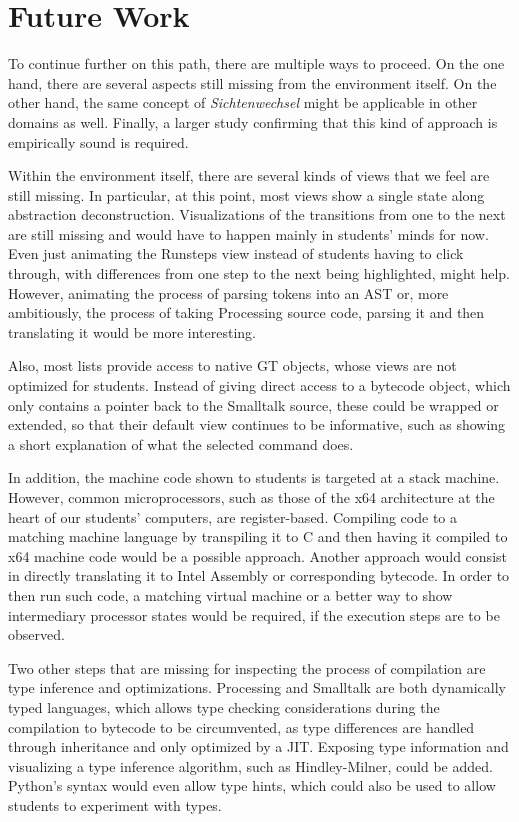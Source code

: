 \section{Future Work} \label{sc_future}

To continue further on this path, there are multiple ways to proceed. On the one hand, there are several aspects still missing from the environment itself. On the other hand, the same concept of \emph{Sichtenwechsel} might be applicable in other domains as well. Finally, a larger study confirming that this kind of approach is empirically sound is required.

Within the environment itself, there are several kinds of views that we feel are still missing. In particular, at this point, most views show a single state along abstraction deconstruction. Visualizations of the transitions from one to the next are still missing and would have to happen mainly in students' minds for now. Even just animating the Runsteps view instead of students having to click through, with differences from one step to the next being highlighted, might help. However, animating the process of parsing tokens into an \ac{AST} or, more ambitiously, the process of taking Processing source code, parsing it and then translating it would be more interesting.

Also, most lists provide access to native \ac{GT} objects, whose views are not optimized for students. Instead of \eg giving direct access to a bytecode object, which only contains a pointer back to the Smalltalk source, these could be wrapped or extended, so that their default view continues to be informative, such as showing a short explanation of what the selected command does.

In addition, the machine code shown to students is targeted at a stack machine. However, common microprocessors, such as those of the x64 architecture at the heart of our students' computers, are register-based. Compiling code to a matching machine language by \eg transpiling it to C and then having it compiled to x64 machine code would be a possible approach. Another approach would consist in directly translating it to Intel Assembly or corresponding bytecode. In order to then run such code, a matching virtual machine or a better way to show intermediary processor states would be required, if the execution steps are to be observed.

Two other steps that are missing for inspecting the process of compilation are type inference and optimizations. Processing and Smalltalk are both dynamically typed languages, which allows type checking considerations during the compilation to bytecode to be circumvented, as type differences are handled through inheritance and only optimized by a \ac{JIT}. Exposing type information and visualizing a type inference algorithm, such as Hindley-Milner, could be added. Python's syntax would even allow type hints, which could also be used to allow students to experiment with types.

